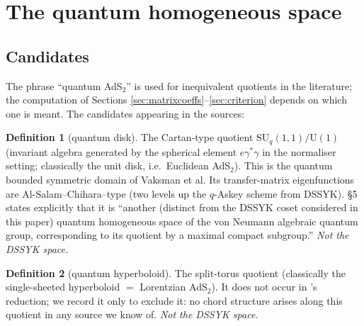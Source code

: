 \documentclass[11pt,a4paper]{article}
\theoremstyle{definition}
\newtheorem{definition}{Definition}[section]
\theoremstyle{plain}
\newcommand{\SUq}{\mathrm{SU}_q(1,1)}
\begin{document}
\section{The quantum homogeneous space}
\label{sec:space}


\subsection{Candidates}
\label{sec:spacecandidates}

The phrase ``quantum AdS$_2$'' is used for inequivalent quotients in the literature; the
computation of Sections \ref{sec:matrixcoeffs}--\ref{sec:criterion} depends on which one is
meant. The candidates appearing in the sources:

\begin{definition}[quantum disk]\label{def:qdisk}
The Cartan-type quotient $\SUq/\mathrm{U}(1)$ (invariant algebra generated by the spherical
element $e\gamma^{*}\gamma$ in the normaliser setting; classically the unit disk, i.e.\
Euclidean AdS$_2$). This is the quantum bounded symmetric domain of Vaksman et al. Its
transfer-matrix eigenfunctions are Al-Salam--Chihara--type (two levels up the $q$-Askey scheme
from DSSYK). \cite{Schouten:2025dssyk} \S5 states explicitly that it is ``another (distinct from
the DSSYK coset considered in this paper) quantum homogeneous space of the von Neumann algebraic
quantum group, corresponding to its quotient by a maximal compact subgroup.'' \emph{Not the DSSYK
space.}
\end{definition}

\begin{definition}[quantum hyperboloid]\label{def:qhyperboloid}
The split-torus quotient (classically the single-sheeted hyperboloid $=$ Lorentzian AdS$_2$).
It does not occur in \cite{Schouten:2025dssyk}'s reduction; we record it only to exclude it:
no chord structure arises along this quotient in any source we know of. \emph{Not the DSSYK
space.}
\end{definition}
\end{document}
